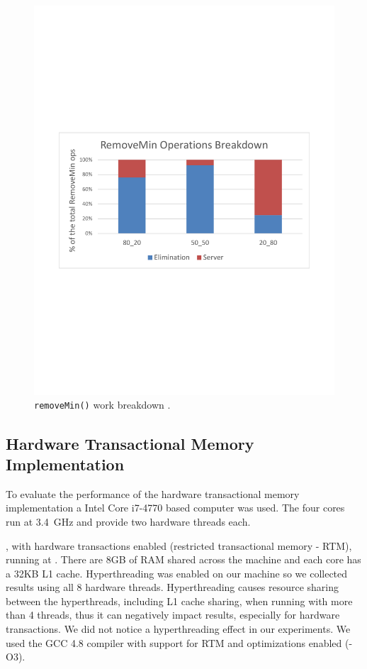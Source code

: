 \begin{figure}[htb]
\begin{minipage}[b]{.495\textwidth}
		\includegraphics[width=\linewidth]{graphics/sparc-rem-brk.pdf}
		\caption{\texttt{removeMin()} work breakdown \cite{calciu_adaptive_2014}.}
		\label{fig:sparc_rem}
	\end{minipage}
\end{figure}

\subsection{Hardware Transactional Memory Implementation}

To evaluate the performance of the hardware transactional memory implementation a Intel Core i7-4770 based computer was used. The four cores run at 3.4~GHz and provide two hardware threads each.

, with hardware transactions enabled (restricted transactional memory - RTM),
running at . There are 8GB of RAM shared across the machine and each core has a 32KB L1
cache. Hyperthreading was enabled on our machine so we collected results using all 8 hardware threads.
Hyperthreading causes resource sharing between the hyperthreads, including L1 cache sharing, when running
with more than 4 threads, thus it can negatively impact results, especially for hardware transactions. We
did not notice a hyperthreading effect in our experiments. We used the GCC 4.8 compiler with support for
RTM and optimizations enabled (-O3).

